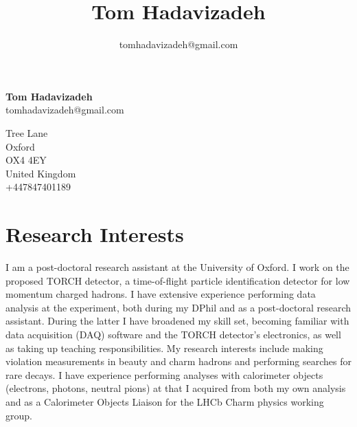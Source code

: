 \documentclass[11pt,a4paper]{article}
\title{\bfseries\Huge Tom Hadavizadeh}
\author{tomhadavizadeh@gmail.com}
\begin{document}
\begin{minipage}[ht]{0.70\textwidth}
{\bfseries\Huge Tom Hadavizadeh}\\[10pt]
{\Large tomhadavizadeh@gmail.com}\\


\end{minipage}
\begin{minipage}[ht]{0.30\textwidth}
{ Tree Lane\\
Oxford\\
OX4 4EY\\
United Kingdom\\
+447847401189\\}
\end{minipage}


\section*{Research Interests}
I am a post-doctoral research assistant at the University of Oxford. I work on the proposed TORCH detector, a time-of-flight particle identification detector for low momentum charged hadrons. I have extensive experience performing data analysis at the \lhcb experiment, both during my DPhil and as a post-doctoral research assistant. During the latter I have broadened my skill set, becoming familiar with data acquisition (DAQ) software and the TORCH detector's electronics, as well as taking up teaching responsibilities. My research interests include making \CP violation measurements in beauty and charm hadrons and performing searches for rare decays. I have experience performing analyses with calorimeter objects (\eg electrons, photons, neutral pions) at \lhcb that I acquired from both my own analysis and as a Calorimeter Objects Liaison for the LHCb Charm physics working group.    
\end{document}
